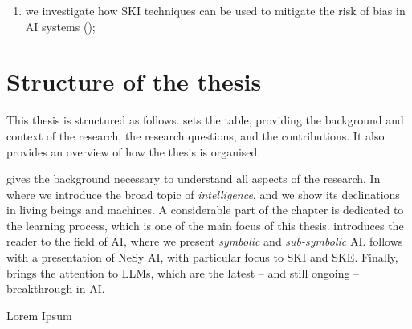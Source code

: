 \begin{refsection}
\begin{enumerate}[label=\emph{(\roman*)}]
    \begin{enumerate}[label=\emph{(\arabic*)},resume]
        \item we investigate how \ac{SKI} techniques can be used to mitigate the risk of bias in \ac{AI} systems ();
    \end{enumerate}
\end{enumerate}


\section{Structure of the thesis}
\label{sec:structure-of-the-thesis2}
%
This thesis is structured as follows.
%
 sets the table, providing the background and context of the research, the research questions, and the contributions.
%
It also provides an overview of how the thesis is organised.


 gives the background necessary to understand all aspects of the research.
%
In  where we introduce the broad topic of \emph{intelligence}, and we show its declinations in living beings and machines.
%
A considerable part of the chapter is dedicated to the learning process, which is one of the main focus of this thesis.
%
 introduces the reader to the field of \ac{AI}, where we present \emph{symbolic} and \emph{sub-symbolic} \ac{AI}.
%
 follows with a presentation of \ac{NeSy} \ac{AI}, with particular focus to \ac{SKI} and \ac{SKE}.
%
Finally,  brings the attention to \acp{LLM}, which are the latest -- and still ongoing -- breakthrough in \ac{AI}.




\label{sec:structure-of-the-thesis}
%
Lorem Ipsum

\printbibliography[title=Reference,heading=bibintoc]

\end{refsection}
